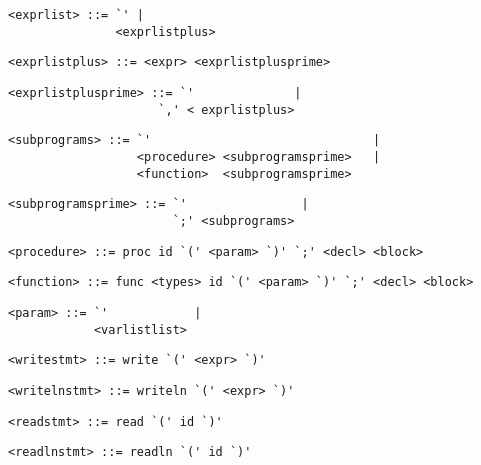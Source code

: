 \begin{footnotesize}
\begin{lstlisting}[frame=single, label={exprlist}, language=pie]
<exprlist> ::= `' | 
               <exprlistplus>
\end{lstlisting}

\begin{lstlisting}[frame=single, label={exprlistplus}, language=pie]
<exprlistplus> ::= <expr> <exprlistplusprime> 
\end{lstlisting}

\begin{lstlisting}[frame=single, label={exprlistplusprime}, language=pie]
<exprlistplusprime> ::= `'              |
                     `,' < exprlistplus> 
\end{lstlisting}

\begin{lstlisting}[frame=single, label={subprograms}, language=pie]
<subprograms> ::= `'                               |
                  <procedure> <subprogramsprime>   |
                  <function>  <subprogramsprime>
\end{lstlisting}

\begin{lstlisting}[frame=single, label={subprogramsprime}, language=pie]
<subprogramsprime> ::= `'                |
                       `;' <subprograms>
\end{lstlisting}

\begin{lstlisting}[frame=single, label={procedure}, language=pie]
<procedure> ::= proc id `(' <param> `)' `;' <decl> <block> 
\end{lstlisting}

\begin{lstlisting}[frame=single, label={function}, language=pie]
<function> ::= func <types> id `(' <param> `)' `;' <decl> <block>
\end{lstlisting}

\begin{lstlisting}[frame=single, label={param}, language=pie]
<param> ::= `'            |
            <varlistlist>
\end{lstlisting}

\begin{lstlisting}[frame=single, label={writestmt}, language=pie]
<writestmt> ::= write `(' <expr> `)'
\end{lstlisting}

\begin{lstlisting}[frame=single, label={writelnstmt}, language=pie]
<writelnstmt> ::= writeln `(' <expr> `)'
\end{lstlisting}

\begin{lstlisting}[frame=single, label={readstmt}, language=pie]
<readstmt> ::= read `(' id `)'
\end{lstlisting}

\begin{lstlisting}[frame=single, label={readlnstmt}, language=pie]
<readlnstmt> ::= readln `(' id `)'
\end{lstlisting}
\end{footnotesize}